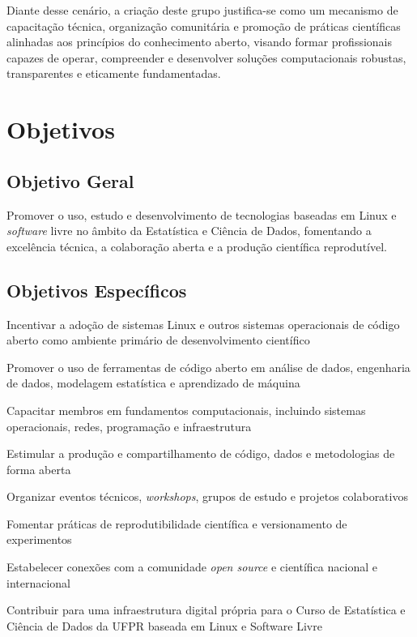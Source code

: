 \documentclass[
  12pt,          %
  a4paper,       %
  oneside,       %
  brazil         %
]{article}
\begin{document}
Diante desse cenário, a criação deste grupo justifica-se como um mecanismo de capacitação técnica, organização comunitária e promoção de 
práticas científicas alinhadas aos princípios do conhecimento aberto, visando formar profissionais capazes de operar, compreender e desenvolver 
soluções computacionais robustas, transparentes e eticamente fundamentadas.

\section{Objetivos}

\subsection{Objetivo Geral}

Promover o uso, estudo e desenvolvimento de tecnologias baseadas em Linux e \textit{software} livre no âmbito da Estatística e Ciência de Dados, 
fomentando a excelência técnica, a colaboração aberta e a produção científica reprodutível.

\subsection{Objetivos Específicos}

\begin{conduta}
  \item Incentivar a adoção de sistemas Linux e outros sistemas operacionais de código aberto como ambiente primário de desenvolvimento científico
  \item Promover o uso de ferramentas de código aberto em análise de dados, engenharia de dados, modelagem estatística e aprendizado de máquina
  \item Capacitar membros em fundamentos computacionais, incluindo sistemas operacionais, redes, programação e infraestrutura
  \item Estimular a produção e compartilhamento de código, dados e metodologias de forma aberta
  \item Organizar eventos técnicos, \textit{workshops}, grupos de estudo e projetos colaborativos
  \item Fomentar práticas de reprodutibilidade científica e versionamento de experimentos
  \item Estabelecer conexões com a comunidade \textit{open source} e científica nacional e internacional
  \item Contribuir para uma infraestrutura digital própria para o Curso de Estatística e Ciência de Dados da UFPR baseada em Linux e Software Livre
\end{conduta}
\end{document}
